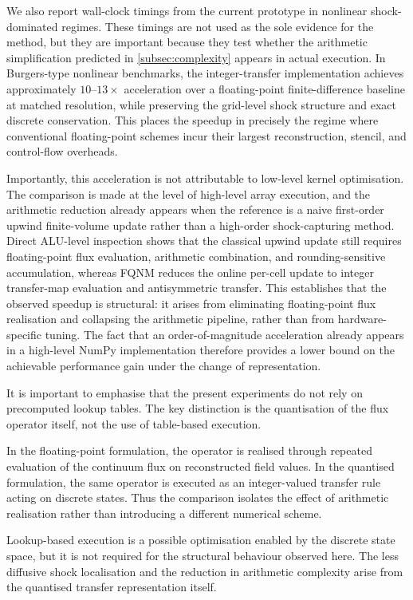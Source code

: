 \documentclass[sn-basic]{sn-jnl}
\theoremstyle{plain}
\theoremstyle{remark}
\begin{document}
We also report wall-clock timings from the current prototype in nonlinear shock-dominated regimes. These timings are not used as the sole evidence for the method, but they are important because they test whether the arithmetic simplification predicted in \cref{subsec:complexity} appears in actual execution. In Burgers-type nonlinear benchmarks, the integer-transfer implementation achieves approximately \(10\text{--}13\times\) acceleration over a floating-point finite-difference baseline at matched resolution, while preserving the grid-level shock structure and exact discrete conservation. This places the speedup in precisely the regime where conventional floating-point schemes incur their largest reconstruction, stencil, and control-flow overheads.

Importantly, this acceleration is not attributable to low-level kernel optimisation. The comparison is made at the level of high-level array execution, and the arithmetic reduction already appears when the reference is a naive first-order upwind finite-volume update rather than a high-order shock-capturing method. Direct ALU-level inspection shows that the classical upwind update still requires floating-point flux evaluation, arithmetic combination, and rounding-sensitive accumulation, whereas FQNM reduces the online per-cell update to integer transfer-map evaluation and antisymmetric transfer. This establishes that the observed speedup is structural: it arises from eliminating floating-point flux realisation and collapsing the arithmetic pipeline, rather than from hardware-specific tuning. The fact that an order-of-magnitude acceleration already appears in a high-level NumPy implementation therefore provides a lower bound on the achievable performance gain under the change of representation.

\par
It is important to emphasise that the present experiments do not rely on precomputed lookup tables. The key distinction is the quantisation of the flux operator itself, not the use of table-based execution.

In the floating-point formulation, the operator is realised through repeated evaluation of the continuum flux on reconstructed field values. In the quantised formulation, the same operator is executed as an integer-valued transfer rule acting on discrete states. Thus the comparison isolates the effect of arithmetic realisation rather than introducing a different numerical scheme.

Lookup-based execution is a possible optimisation enabled by the discrete state space, but it is not required for the structural behaviour observed here. The less diffusive shock localisation and the reduction in arithmetic complexity arise from the quantised transfer representation itself.
\end{document}
